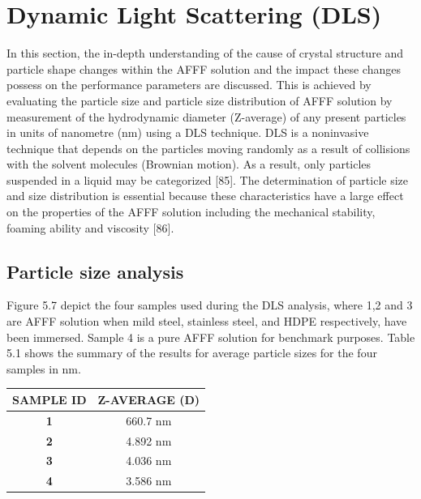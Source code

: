 \documentclass[12pt]{report}
\begin{document}
\section{Dynamic Light Scattering (DLS)}
In this section, the in-depth understanding of the cause of crystal structure and particle shape changes within the AFFF solution and the impact these changes possess on the performance parameters are discussed. This is achieved by evaluating the particle size and particle size distribution of AFFF solution by measurement of the hydrodynamic diameter (Z-average) of any present particles in units of nanometre (nm) using a DLS technique. DLS is a noninvasive technique that depends on the particles moving randomly as a result of collisions with the solvent molecules (Brownian motion). As a result, only particles suspended in a liquid may be categorized [85]. The determination of particle size and size distribution is essential because these characteristics have a large effect on the properties of the AFFF solution including the mechanical stability, foaming ability and viscosity [86].

\subsection{Particle size analysis}
Figure 5.7 depict the four samples used during the DLS analysis, where 1,2 and 3 are AFFF solution when mild steel, stainless steel, and HDPE respectively, have been immersed. Sample 4 is a pure AFFF solution for benchmark purposes. Table 5.1 shows the summary of the results for average particle sizes for the four samples in nm.  
  


\begin{center}
\begin{tabular}{c c}
\hline
\textbf{SAMPLE ID} & \textbf{Z-AVERAGE (D)} \\
\hline
\textbf{1} & 660.7 nm \\
\textbf{2} & 4.892 nm \\
\textbf{3} & 4.036 nm \\
\textbf{4} & 3.586 nm \\
\hline
\end{tabular}
\end{center}
\end{document}
